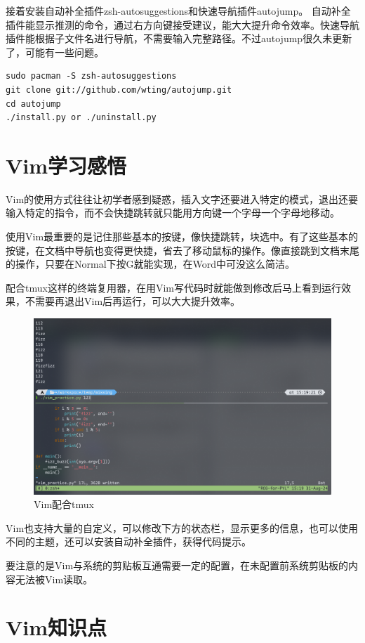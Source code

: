 \documentclass[fontset=ubuntu]{ctexart}
\begin{document}
\begin{sloppypar}
接着安装自动补全插件zsh-autosuggestions和快速导航插件autojump。
自动补全插件能显示推测的命令，通过右方向键接受建议，能大大提升命令效率。快速导航插件能根据子文件名进行导航，不需要输入完整路径。不过autojump很久未更新了，可能有一些问题。
\begin{listing}[htb]
\begin{verbatim}
sudo pacman -S zsh-autosuggestions
git clone git://github.com/wting/autojump.git
cd autojump
./install.py or ./uninstall.py
\end{verbatim}
\end{listing}

\section{Vim学习感悟}
Vim的使用方式往往让初学者感到疑惑，插入文字还要进入特定的模式，退出还要输入特定的指令，而不会快捷跳转就只能用方向键一个字母一个字母地移动。

使用Vim最重要的是记住那些基本的按键，像快捷跳转，块选中。有了这些基本的按键，在文档中导航也变得更快捷，省去了移动鼠标的操作。像直接跳到文档末尾的操作，只要在Normal下按G就能实现，在Word中可没这么简洁。

配合tmux这样的终端复用器，在用Vim写代码时就能做到修改后马上看到运行效果，不需要再退出Vim后再运行，可以大大提升效率。
\begin{figure}[htb]
    \centering
    \includegraphics[width=0.75\linewidth]{Vim.png}
    \caption{Vim配合tmux}
    \label{fig:Vim}
\end{figure}

Vim也支持大量的自定义，可以修改下方的状态栏，显示更多的信息，也可以使用不同的主题，还可以安装自动补全插件，获得代码提示。

要注意的是Vim与系统的剪贴板互通需要一定的配置，在未配置前系统剪贴板的内容无法被Vim读取。

\section{Vim知识点}

\end{sloppypar}
\end{document}
